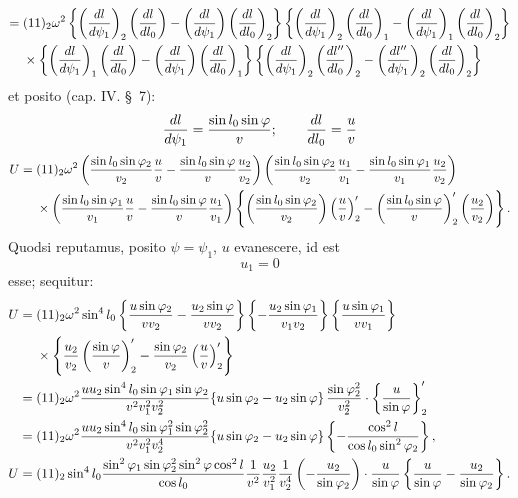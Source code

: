 \begingroup\scriptsize
\[
\begin{aligned}
={}&(11)_2\omega^2\left\{\left({dl\over d\psi_1}\right)_2\left({dl\over dl_0}\right)-
\left({dl\over d\psi_1}\right)\left({dl\over dl_0}\right)_2\right\}
\left\{\left({dl\over d\psi_1}\right)_2\left({dl\over dl_0}\right)_1-
\left({dl\over d\psi_1}\right)_1\left({dl\over dl_0}\right)_2\right\}\\
&\times\left\{\left({dl\over d\psi_1}\right)_1\left({dl\over dl_0}\right)-
\left({dl\over d\psi_1}\right)\left({dl\over dl_0}\right)_1\right\}
\left\{\left({dl\over d\psi_1}\right)_2\left({dl''\over dl_0}\right)_2-
\left({dl''\over d\psi_1}\right)_2\left({dl\over dl_0}\right)_2\right\}
\end{aligned}
\]
\endgroup
et posito (cap. IV. \S\ 7):
\[
 {dl\over d\psi_1}={\sin l_0\sin\varphi\over v};
 \qquad {dl\over dl_0}={u\over v}
\]
\begingroup\scriptsize
\[
\begin{aligned}
U={}&(11)_2\omega^2
\left({\sin l_0\sin\varphi_2\over v_2}{u\over v}-{\sin l_0\sin\varphi\over v}{u_2\over v_2}\right)
\left({\sin l_0\sin\varphi_2\over v_2}{u_1\over v_1}-{\sin l_0\sin\varphi_1\over v_1}{u_2\over v_2}\right)\\
&\times\left({\sin l_0\sin\varphi_1\over v_1}{u\over v}-{\sin l_0\sin\varphi\over v}{u_1\over v_1}\right)
\left\{\left({\sin l_0\sin\varphi_2\over v_2}\right)\left({u\over v}\right)'_2-
\left({\sin l_0\sin\varphi\over v}\right)'_2\left({u_2\over v_2}\right)\right\}.
\end{aligned}
\]
\endgroup
Quodsi reputamus, posito $\psi=\psi_1$, $u$ evanescere, id est
\[
 u_1=0
\]
esse; sequitur:
\begingroup\scriptsize
\[
\begin{aligned}
U={}&(11)_2\omega^2\sin^4l_0
\left\{{u\sin\varphi_2\over vv_2}-{u_2\sin\varphi\over vv_2}\right\}
\left\{-{u_2\sin\varphi_1\over v_1v_2}\right\}
\left\{{u\sin\varphi_1\over vv_1}\right\}\\
&\times\left\{{u_2\over v_2}\left({\sin\varphi\over v}\right)'_2-{\sin\varphi_2\over v_2}\left({u\over v}\right)'_2\right\}\\
={}&(11)_2\omega^2{uu_2\sin^4l_0\sin\varphi_1\sin\varphi_2\over v^2v_1^2v_2^2}
\{u\sin\varphi_2-u_2\sin\varphi\}\,{\sin\varphi_2^2\over v_2^2}\cdot\left\{{u\over \sin\varphi}\right\}'_2\\
={}&(11)_2\omega^2{uu_2\sin^4l_0\sin\varphi_1^2\sin\varphi_2^2\over v^2v_1^2v_2^4}
\{u\sin\varphi_2-u_2\sin\varphi\}\left\{-{\cos^2l\over \cos l_0\sin^2\varphi_2}\right\},\\
U={}&(11)_2\sin^4l_0{\sin^2\varphi_1\sin\varphi_2^2\sin^2\varphi\cos^2l\over \cos l_0}{1\over v^2}{u_2\over v_1^2}{1\over v_2^4}
\left(-{u_2\over \sin\varphi_2}\right)\cdot{u\over \sin\varphi}\left\{{u\over \sin\varphi}-{u_2\over \sin\varphi_2}\right\}.
\end{aligned}
\]
\endgroup


